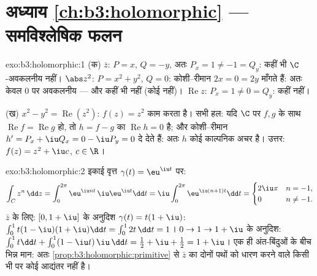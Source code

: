 \section*{अध्याय \ref{ch:b3:holomorphic} --- समविश्लेषिक
फलन}

\begin{solution}{exo:b3:holomorphic:1}
(क) $\bar z$: $P = x$, $Q = -y$, अतः $P_x = 1 \neq -1 = Q_y$: कहीं भी $\C$-अवकलनीय नहीं। $\abs z^2$: $P = x^2 + y^2$,
$Q =
0$: कोशी--रीमान $2x = 0 = 2y$ माँगते हैं: अतः केवल $0$ पर अवकलनीय --- और
कहीं भी  नहीं (कोई  नहीं)। $\operatorname{Re}z$: $P_x = 1 \neq 0 = Q_y$: कहीं
नहीं।

(ख) $x^2 - y^2 = \operatorname{Re}(z^2)$: $f(z) = z^2$ काम करता है। सभी हल: यदि  $\C$ पर 
$f, g$ के साथ $\operatorname{Re}f = \operatorname{Re}g$ हो, तो $h = f -
g$ का $\operatorname{Re}h = 0$ है; और कोशी--रीमान $h' =
P_x + \iu Q_x = 0 - \iu P_y = 0$ दे देते
हैं: अतः $h$ कोई काल्पनिक अचर है। उत्तर: $f(z) = z^2 + \iu c$, $c \in \R$।
\end{solution}

\begin{solution}{exo:b3:holomorphic:2}
इकाई वृत्त $\gamma(t) = \eu^{\iu t}$ पर:
\[
\int_C z^n\,\dd z = \int_0^{2\pi}\eu^{\iu nt}\,\iu\eu^{\iu
t}\dd t = \iu\int_0^{2\pi}\eu^{\iu(n+1)t}\dd t
= \begin{cases} 2\iu\pi & n = -1,\\ 0 & n \neq -1.\end{cases}
\]
$\bar z$ के लिए: $[0, 1+\iu]$ के अनुदिश $\gamma(t) = t(1 + \iu)$: $\int_0^1 t(1 - \iu)(1 + \iu)\dd t = \int_0^12t\,\dd t = 1$। $0 \to 1 \to 1 + \iu$ के अनुदिश: $\int_0^1t\dd t +
\int_0^1(1 - \iu t)\,\iu\,\dd t = \frac12 + \iu + \frac12 = 1
+ \iu$। एक ही
अंत-बिंदुओं के बीच भिन्न मान: अतः \cref{prop:b3:holomorphic:primitive} से $\bar z$ का दोनों पथों को धारण
करने वाले किसी भी  पर कोई आद्यंतर नहीं है।
\end{solution}

